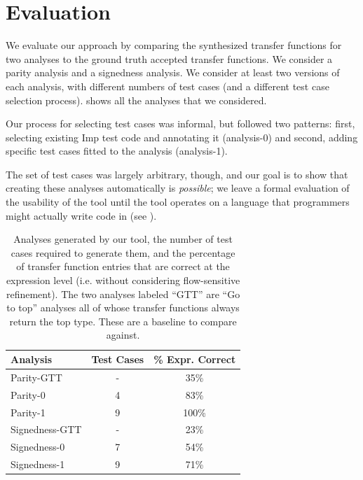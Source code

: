 \documentclass[10pt,conference]{IEEEtran}
\begin{document}
\section{Evaluation}
\label{sec-eval}

We evaluate our approach by comparing the synthesized transfer
functions for two analyses to the ground truth accepted transfer
functions. We consider a parity analysis and a signedness analysis.
We consider at least two versions of each analysis, with different
numbers of test cases (and a different test case selection process).
 shows all the analyses that we considered.

Our process for selecting test cases was informal, but followed two 
patterns:  first, selecting existing Imp test code and annotating it
(analysis-0) and second, adding specific test cases fitted to the analysis (analysis-1).

The set of test cases was largely arbitrary, though, and our goal is to show that 
creating these analyses automatically is \emph{possible}; 
we leave a formal evaluation of the usability of the
tool until the tool operates on a language that programmers might
actually write code in (see ).

\begin{table}
\centering
 \begin{tabular}{l c c }
  Analysis & Test Cases & \% Expr. Correct \\ 
  \midrule
  Parity-GTT & - & 35\% \\
  Parity-0 & 4 & 83\% \\
  Parity-1 & 9 & 100\% \\
  \midrule
  Signedness-GTT & - & 23\% \\
  Signedness-0 & 7 & 54\% \\
  Signedness-1 & 9 & 71\% \\
 \end{tabular}
 \caption{Analyses generated by our tool, the number of test cases
 required to generate them, and the percentage of transfer function
 entries that are correct at the expression level (i.e. without
 considering flow-sensitive refinement). The two analyses labeled
 ``GTT'' are ``Go to top'' analyses all of whose transfer functions
 always return the top type. These are a baseline to compare against.}
 \label{tab-analyses}
\end{table}
\end{document}
